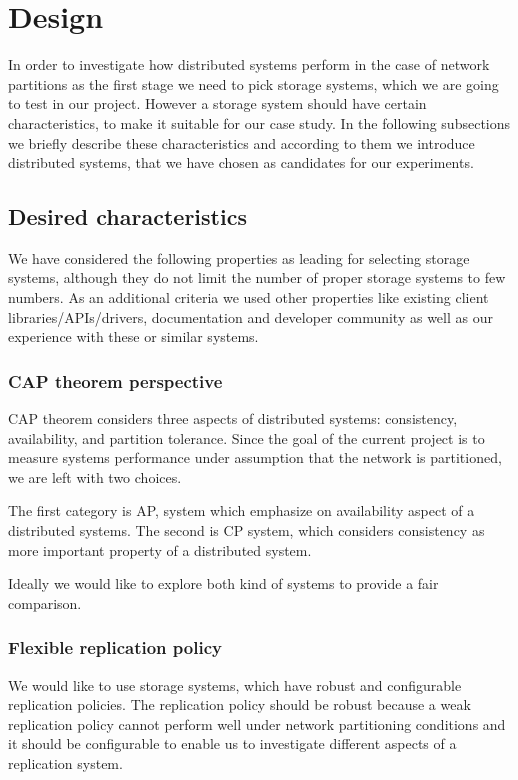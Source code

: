 \documentclass[a4paper]{article}
\begin{document}
\section{Design}

In order to investigate how distributed systems perform in the case of network partitions as the first stage we need to pick storage systems, which we are going to test in our project.
However a storage system should have certain characteristics, to make it suitable for our case study. 
In the following subsections we briefly describe these characteristics and according to them we introduce distributed systems, that we have chosen as candidates for our experiments.

\subsection{Desired characteristics}

We have considered the following properties as leading for selecting storage systems, although they do not limit the number of proper storage systems to few numbers.
As an additional criteria we used other properties like existing client libraries/APIs/drivers, documentation and developer community as well as our experience with these or similar systems.

\subsubsection*{CAP theorem perspective}
CAP theorem considers three aspects of distributed systems: consistency, availability, and partition tolerance. 
Since the goal of the current project is to measure systems performance under assumption that the network is partitioned, we are left with two choices. 

The first category is AP, system which emphasize on availability aspect of a distributed systems. 
The second is CP system, which considers consistency as more important property of a distributed system.

Ideally we would like to explore both kind of systems to provide a fair comparison.

\subsubsection*{Flexible replication policy}
We would like to use storage systems, which have robust and configurable replication policies. 
The replication policy should be robust because a weak replication policy cannot perform well under network partitioning conditions and it should be configurable to enable us to investigate different aspects of a replication system.
\end{document}
